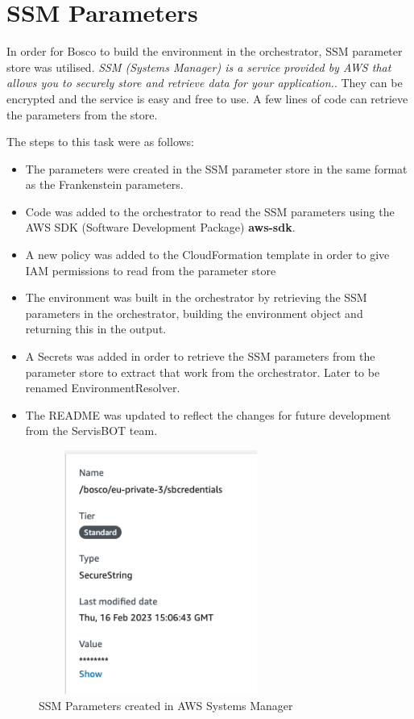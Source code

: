 \documentclass[12pt,a4paper,titlepage]{report}
\begin{document}
\section{SSM Parameters}
In order for Bosco to build the environment in the orchestrator, SSM parameter store was utilised. 
\textit{SSM (Systems Manager) is a service provided by AWS that allows you to securely store and retrieve data for your application.}\autocite{Halley}.
They can be encrypted and the service is easy and free to use. 
A few lines of code can retrieve the parameters from the store. 

The steps to this task were as follows:
\begin{itemize}
\item The parameters were created in the SSM parameter store in the same format as the Frankenstein parameters.
\item Code was added to the orchestrator to read the SSM parameters using the AWS SDK (Software Development Package) \textbf{aws-sdk}.
\item A new policy was added to the  CloudFormation template in order to give IAM permissions to read from the parameter store
\item The environment was built in the orchestrator by retrieving the SSM parameters in the orchestrator, building the environment object and returning this in the output.
\item A Secrets was added in order to retrieve the SSM parameters from the parameter store to extract that work from the orchestrator. Later to be renamed EnvironmentResolver. 
\item The README was updated to reflect the changes for future development from the ServisBOT team.
\end{itemize}

\begin{figure}[H]
 \centering
 \includegraphics[width=8cm,height=8cm,keepaspectratio]{./diagrams/ssm_params.png}
 \caption{SSM Parameters created in AWS Systems Manager}
\end{figure}
\end{document}
